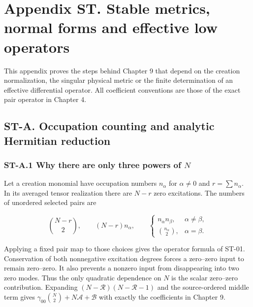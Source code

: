 \clearpage
\hypertarget{appendix-st.-stable-metrics-normal-forms-and-effective-low-operators}{%
\section{Appendix ST. Stable metrics, normal forms and effective low operators}\label{appendix-st.-stable-metrics-normal-forms-and-effective-low-operators}}

This appendix proves the steps behind Chapter 9 that depend on the creation normalization, the singular physical metric or the finite determination of an effective differential operator. All coefficient conventions are those of the exact pair operator in Chapter 4.

\hypertarget{st-a.-occupation-counting-and-analytic-hermitian-reduction}{%
\subsection{ST-A. Occupation counting and analytic Hermitian reduction}\label{st-a.-occupation-counting-and-analytic-hermitian-reduction}}

\hypertarget{st-a.1-why-there-are-only-three-powers-of-n}{%
\subsubsection{\texorpdfstring{ST-A.1 Why there are only three powers of \(N\)}{ST-A.1 Why there are only three powers of N}}\label{st-a.1-why-there-are-only-three-powers-of-n}}

Let a creation monomial have occupation numbers \(n_\alpha\) for \(\alpha\ne0\) and \(r=\sum n_\alpha\). In its averaged tensor realization there are \(N-r\) zero excitations. The numbers of unordered selected pairs are

\[
\binom{N-r}{2},\qquad (N-r)n_\alpha,\qquad
\begin{cases}
n_\alpha n_\beta,&\alpha\ne\beta,\\
\binom{n_\alpha}{2},&\alpha=\beta.
\end{cases}
\]

Applying a fixed pair map to those choices gives the operator formula of ST-01. Conservation of both nonnegative excitation degrees forces a zero--zero input to remain zero--zero. It also prevents a nonzero input from disappearing into two zero modes. Thus the only quadratic dependence on \(N\) is the scalar zero--zero contribution. Expanding \((N-\mathcal R)(N-\mathcal R-1)\) and the source-ordered middle term gives \(\gamma_{00}\binom N2+N\mathscr A+\mathscr B\) with exactly the coefficients in Chapter 9.

